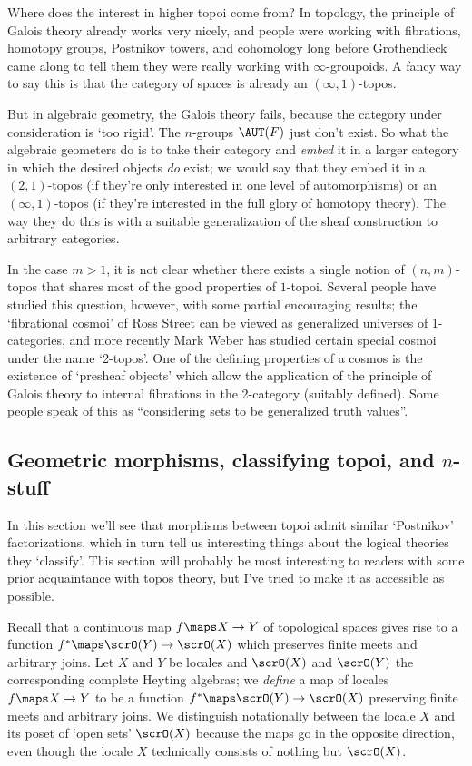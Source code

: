 \documentclass[12pt]{amsart}
\begin{document}
Where does the interest in higher topoi come from?  In topology, the
principle of Galois theory already works very nicely, and people were
working with fibrations, homotopy groups, Postnikov towers, and
cohomology long before Grothendieck came along to tell them they were
really working with $\infty$-groupoids.  A fancy way to say this is
that the category of spaces is already an $(\infty,1)$-topos.

But in algebraic geometry, the Galois theory fails, because the
category under consideration is `too rigid'.  The $n$-groups $\AUT(F)$
just don't exist.  So what the algebraic geometers do is to take their
category and \emph{embed} it in a larger category in which the desired
objects \emph{do} exist; we would say that they embed it in a
$(2,1)$-topos (if they're only interested in one level of
automorphisms) or an $(\infty,1)$-topos (if they're interested in the
full glory of homotopy theory).  The way they do this is with a
suitable generalization of the sheaf construction to arbitrary
categories.

In the case $m>1$, it is not clear whether there exists a single
notion of $(n,m)$-topos that shares most of the good properties of
$1$-topoi.  Several people have studied this question, however, with
some partial encouraging results; the `fibrational cosmoi' of Ross
Street can be viewed as generalized universes of 1-categories, and
more recently Mark Weber has studied certain special cosmoi under the
name `2-topos'.  One of the defining properties of a cosmos is the
existence of `presheaf objects' which allow the application of the
principle of Galois theory to internal fibrations in the 2-category
(suitably defined).  Some people speak of this as ``considering sets
to be generalized truth values''.



\subsection{Geometric morphisms, classifying topoi, and $n$-stuff}
\label{sec:geom-morph}

In this section we'll see that morphisms between topoi admit similar
`Postnikov' factorizations, which in turn tell us interesting things
about the logical theories they `classify'.  This section will
probably be most interesting to readers with some prior acquaintance
with topos theory, but I've tried to make it as accessible as
possible.

Recall that a continuous map $f\maps X\to Y$ of topological spaces
gives rise to a function $f^*\maps \scrO(Y)\to \scrO(X)$ which
preserves finite meets and arbitrary joins.  Let $X$ and $Y$ be
locales and $\scrO(X)$ and $\scrO(Y)$ the corresponding complete
Heyting algebras; we \emph{define} a map of locales $f\maps X\to Y$ to
be a function $f^*\maps \scrO(Y)\to \scrO(X)$ preserving finite meets
and arbitrary joins.  We distinguish notationally between the locale
$X$ and its poset of `open sets' $\scrO(X)$ because the maps go in the
opposite direction, even though the locale $X$ technically consists of
nothing but $\scrO(X)$.
\end{document}
